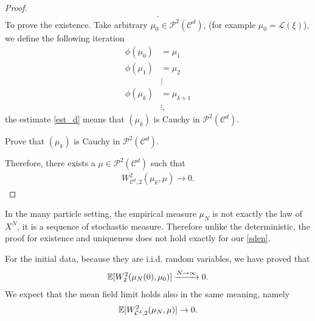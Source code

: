 \begin{proof}
\begin{align*}
.\end{align*}
To prove the existence. Take arbitrary $\mu_0 \in  \mathcal{P}^2(\mathcal{C}^{d} )$, (for example $\mu_0 = \mathcal{L}(\xi)$), we define the following iteration
\begin{align*}
  \phi(\mu_0) &= \mu_1 \\
  \phi(\mu_1) &= \mu_2 \\
              &\vdots \\
  \phi(\mu_k) &= \mu_{k+1}\\
  &\vdots
,\end{align*}
the estimate \autoref{est_d} means that $(\mu_k)$ is Cauchy in $\mathcal{P}^2(\mathcal{C}^{d} )$.
\begin{exercise}
	Prove that $(\mu_k)$ is Cauchy in $\mathcal{P}^2(\mathcal{C}^{d} )$.
	\end{exercise}
Therefore, there exists a $\mu \in \mathcal{P}^2(\mathcal{C}^{d} )$ such that 
\begin{align*}
   W_{\mathcal{C}^{d},2 }^{2}(\mu_k,\mu ) \to  0 
.\end{align*}
\end{proof}


\vskip5mm
In the many particle setting, the empirical measure $\mu_N$ is not exactly the law of $X^{N}$, it is a sequence of stochastic measure. Therefore unlike the deterministic, the proof for existence and uniqueness does not hold exactly for our \autoref{sden}.

For the initial data, because they are i.i.d. random variables, we have proved that
 \begin{align*}
   \mathbb{E}[W_2^2(\mu_N(0),\mu_0  )] \xrightarrow{N\to \infty} 0
 .\end{align*}
We expect that the mean field limit holds also in the same meaning, namely 
 \begin{align*}
   \mathbb{E}[W_{\mathcal{C}^{d},2 }^2(\mu_N,\mu )] \to 0
 .\end{align*}

